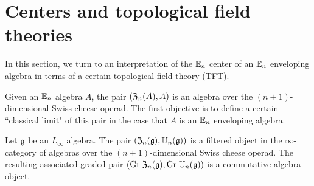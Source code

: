 \documentclass[11pt]{amsart}
\numberwithin{equation}{section}
\begin{document}
\section{Centers and topological field theories}
\label{sec: TFT}
%
%
%
%

In this section, we turn to an interpretation of the $\mathbb E_n$ center of an $\mathbb E_n$ enveloping algebra in terms of a certain topological field theory (TFT).

Given an $\mathbb E_n$ algebra $A$, the pair $(\mathfrak Z_n (A) , A)$ is an algebra over the $(n+1)$-dimensional Swiss cheese operad. 
The first objective is to define a certain ``classical limit" of this pair in the case that $A$ is an $\mathbb E_n$ enveloping algebra. 

\begin{prp} \label{prp:swiss1}
Let $\mathfrak g$ be an $L_\infty$ algebra. 
The pair $(\mathfrak Z_n(\mathfrak g) , \mathbb U_n(\mathfrak g))$ is a filtered object in the $\infty$-category of algebras over the $(n+1)$-dimensional Swiss cheese operad. 
The resulting associated graded pair $({\rm Gr} \; \mathfrak Z_n(\mathfrak g) , {\rm Gr} \; \mathbb U_n(\mathfrak g))$ is a commutative algebra object.
\end{prp}
\end{document}
